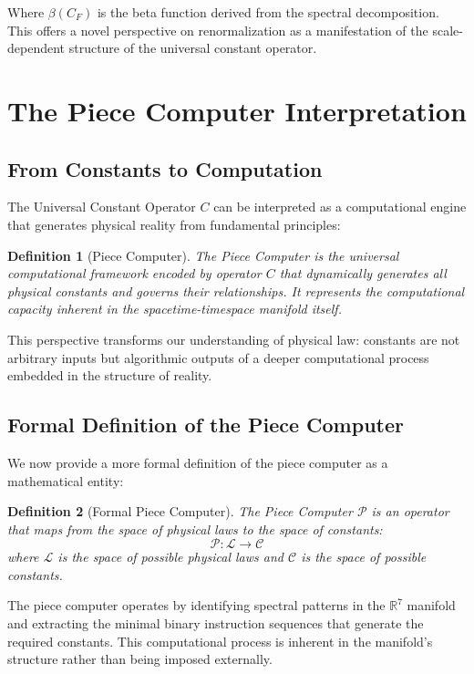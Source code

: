 \documentclass{article}
\newtheorem{definition}{Definition}
\begin{document}
Where $\beta(C_F)$ is the beta function derived from the spectral decomposition. This offers a novel perspective on renormalization as a manifestation of the scale-dependent structure of the universal constant operator.

\section{The Piece Computer Interpretation}

\subsection{From Constants to Computation}

The Universal Constant Operator $C$ can be interpreted as a computational engine that generates physical reality from fundamental principles:

\begin{definition}[Piece Computer]
The Piece Computer is the universal computational framework encoded by operator $C$ that dynamically generates all physical constants and governs their relationships. It represents the computational capacity inherent in the spacetime-timespace manifold itself.
\end{definition}

This perspective transforms our understanding of physical law: constants are not arbitrary inputs but algorithmic outputs of a deeper computational process embedded in the structure of reality.

\subsection{Formal Definition of the Piece Computer}

We now provide a more formal definition of the piece computer as a mathematical entity:

\begin{definition}[Formal Piece Computer]
The Piece Computer $\mathcal{P}$ is an operator that maps from the space of physical laws to the space of constants:
\begin{equation}
\mathcal{P}: \mathcal{L} \to \mathcal{C}
\end{equation}
where $\mathcal{L}$ is the space of possible physical laws and $\mathcal{C}$ is the space of possible constants.
\end{definition}

The piece computer operates by identifying spectral patterns in the $\mathbb{R}^7$ manifold and extracting the minimal binary instruction sequences that generate the required constants. This computational process is inherent in the manifold's structure rather than being imposed externally.
\end{document}
